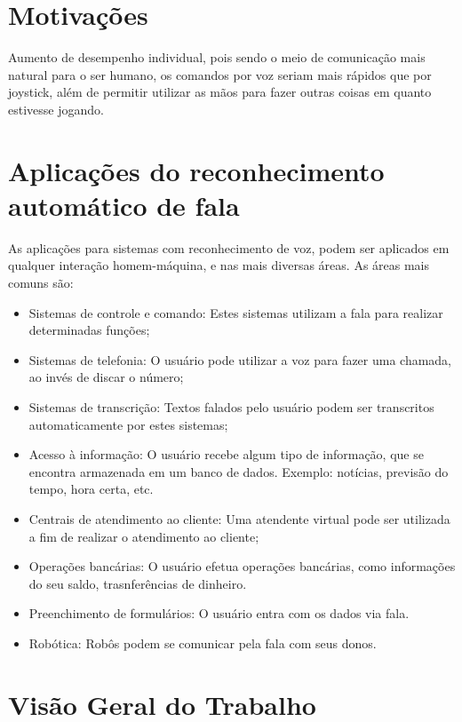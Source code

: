\section{Motivações}
Aumento de desempenho individual, pois sendo o meio de comunicação mais natural para o ser humano, os comandos por voz seriam mais rápidos que por joystick, além de permitir utilizar as mãos para fazer outras coisas em quanto estivesse jogando.

\section{Aplicações do reconhecimento automático de fala}
As aplicações para sistemas com reconhecimento de voz, podem ser aplicados em qualquer interação homem-máquina, 
e nas mais diversas áreas. As áreas mais comuns são: \cite{AvaliaTecJose}

\begin{itemize}
\item Sistemas de controle e comando: Estes sistemas utilizam a fala para realizar
determinadas funções;
\item Sistemas de telefonia: O usuário pode utilizar a voz para fazer uma chamada, ao
invés de discar o número;
\item Sistemas de transcrição: Textos falados pelo usuário podem ser transcritos
automaticamente por estes sistemas;
\item Acesso à informação: O usuário recebe algum tipo de informação, que se encontra armazenada em um banco de dados. Exemplo: notícias, previsão do tempo, hora certa, etc.
\item Centrais de atendimento ao cliente: Uma atendente virtual pode ser utilizada a fim
de realizar o atendimento ao cliente;
\item Operações bancárias: O usuário efetua operações bancárias, como informações do seu saldo, trasnferências de dinheiro.
\item Preenchimento de formulários: O usuário entra com os dados via fala.
\item Robótica: Robôs podem se comunicar pela fala com seus donos.

\end{itemize}

\section{Visão Geral do Trabalho}









